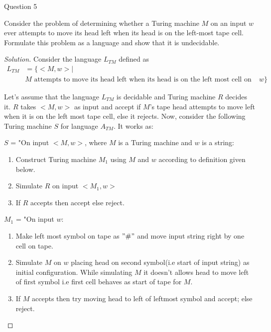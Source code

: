 \begin{solution}{Question 5}\label{ques:5}
    \begin{question}
        Consider the problem of determining whether a Turing machine $M$ on an input $w$ ever attempts to move its head left when its head is on the left-most tape cell. Formulate this problem as a language and show that it is undecidable. 
    \end{question}
    \tcblower{}
    \begin{proof}[Solution]
        Consider the language $L_{TM}$ defined as
        \begin{equation}
            \begin{split}
                L_{TM}  &= \{<M, w> | \\
                        &M \text{ attempts to move its head left when its head is on the left most cell on input } w\}
            \end{split}
        \end{equation}
        
        Let's assume that the language $L_{TM}$ is decidable and Turing machine $R$ decides it. $R$ takes $<M, w>$ as input and accept if $M$'s tape head attempts to move left when it is on the left most tape cell, else it rejects. Now, consider the following Turing machine $S$ for language $A_{TM}$. It works as:
        
        \bigskip
        
        $S$ = "On input $<M, w>$, where $M$ is a Turing machine and $w$ is a string:
        \begin{enumerate}
            \item Construct Turing machine $M_1$ using $M$ and $w$ according to definition given below.
            \item Simulate $R$ on input $<M_1, w>$
            \item If $R$ accepts then accept else reject.
        \end{enumerate}
        
        $M_1$ = "On input $w$:
        \begin{enumerate}
            \item Make left most symbol on tape as $"\#"$ and move input string right by one cell on tape.
            \item Simulate $M$ on $w$ placing head on second symbol(i.e start of input string) as initial configuration. While simulating $M$ it doesn't allows head to move left of first symbol i.e first cell behaves as start of tape for $M$.
            \item If $M$ accepts then try moving head to left of leftmost symbol and accept; else reject.
        \end{enumerate}
        

\end{proof}
\end{solution}
